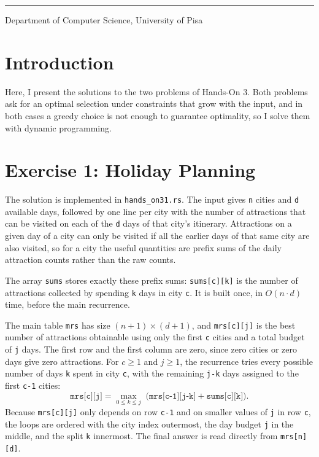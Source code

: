 \documentclass[11pt,a4paper]{article}
\begin{document}
\vspace{0.8cm}
{\color{LightGray}\rule{\textwidth}{0.8pt}\par}
\vspace{0.2cm}
{\small\color{SoftGray}Department of Computer Science, University of Pisa\par}

\newpage
\section*{Introduction}
Here, I present the solutions to the two problems of Hands-On 3. Both
problems ask for an optimal selection under constraints that grow with the
input, and in both cases a greedy choice is not enough to guarantee
optimality, so I solve them with dynamic programming.

\section*{Exercise 1: Holiday Planning}
The solution is implemented in \texttt{hands\_on31.rs}. The input gives
\texttt{n} cities and \texttt{d} available days, followed by one line per
city with the number of attractions that can be visited on each of the
\texttt{d} days of that city's itinerary. Attractions on a given day of a
city can only be visited if all the earlier days of that same city are also
visited, so for a city the useful quantities are prefix sums of the daily
attraction counts rather than the raw counts.

The array \texttt{sums} stores exactly these prefix sums: \texttt{sums[c][k]}
is the number of attractions collected by spending \texttt{k} days in city
\texttt{c}. It is built once, in \(O(n \cdot d)\) time, before the main
recurrence.

The main table \texttt{mrs} has size \((n+1) \times (d+1)\), and
\texttt{mrs[c][j]} is the best number of attractions obtainable using only
the first \texttt{c} cities and a total budget of \texttt{j} days. The first
row and the first column are zero, since zero cities or zero days give zero
attractions. For \(c \geq 1\) and \(j \geq 1\), the recurrence tries every
possible number of days \texttt{k} spent in city \texttt{c}, with the
remaining \texttt{j-k} days assigned to the first \texttt{c-1} cities:
\[
    \texttt{mrs[c][j]} = \max_{0 \le k \le j} \; \big( \texttt{mrs[c-1][j-k]} + \texttt{sums[c][k]} \big).
\]
Because \texttt{mrs[c][j]} only depends on row \texttt{c-1} and on smaller
values of \texttt{j} in row \texttt{c}, the loops are ordered with the city
index outermost, the day budget \texttt{j} in the middle, and the split
\texttt{k} innermost. The final answer is read directly from
\texttt{mrs[n][d]}.
\end{document}
